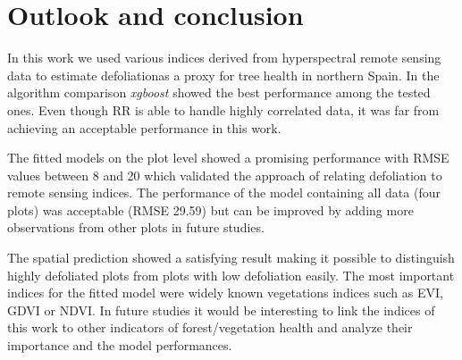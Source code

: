 \documentclass[review]{elsarticle}
\begin{document}



\section{Outlook and conclusion}

\noindent In this work we used various indices derived from hyperspectral remote sensing data to estimate defoliationas a proxy for tree health in northern Spain.
In the algorithm comparison \textit{xgboost} showed the best performance among the tested ones.
Even though \ac{RR} is able to handle highly correlated data, it was far from achieving an acceptable performance in this work.

The fitted models on the plot level showed a promising performance with RMSE values between 8 and 20 which validated the approach of relating defoliation to remote sensing indices.
The performance of the model containing all data (four plots) was acceptable (RMSE 29.59) but can be improved by adding more observations from other plots in future studies.

The spatial prediction showed a satisfying result making it possible to distinguish highly defoliated plots from plots with low defoliation easily.
The most important indices for the fitted model were widely known vegetations indices such as EVI, GDVI or NDVI.
In future studies it would be interesting to link the indices of this work to other indicators of forest/vegetation health and analyze their importance and the model performances.
\end{document}
